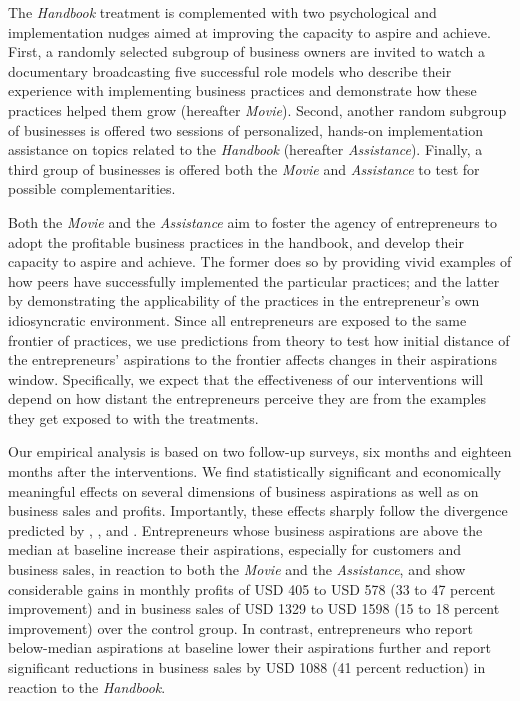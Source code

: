 \documentclass[11.5pt]{article}
\begin{document}

The \emph{Handbook} treatment is complemented with two psychological and implementation nudges aimed at improving the capacity to aspire and achieve. First, a randomly selected subgroup of business owners are invited to watch a documentary broadcasting five successful role models who describe their experience with implementing business practices and demonstrate how these practices helped them grow (hereafter \emph{Movie}).
Second, another random subgroup of businesses is offered two sessions of personalized, hands-on implementation assistance on topics related to the \emph{Handbook} (hereafter \emph{Assistance}). Finally, a third group of businesses is offered both the \emph{Movie} and \emph{Assistance} to test for possible complementarities.

Both the \emph{Movie} and the \emph{Assistance} aim to foster the agency of entrepreneurs to adopt the profitable business practices in the handbook, and develop their capacity to aspire and achieve. The former does so by providing vivid examples of how peers have successfully implemented the particular practices; and the latter by demonstrating the applicability of the practices in the entrepreneur's own idiosyncratic environment. Since all entrepreneurs are exposed to the same frontier of practices, we use predictions from theory to test how initial distance of the entrepreneurs' aspirations to the frontier affects changes in their aspirations window. Specifically, we expect that the effectiveness of our interventions will depend on how distant the entrepreneurs perceive they are from the examples they get exposed to with the treatments.

Our empirical analysis is based on two follow-up surveys, six months and eighteen months after the interventions. We find statistically significant and economically meaningful effects on several dimensions of business aspirations as well as on business sales and profits. Importantly, these effects sharply follow the divergence predicted by \citet{Ray2006}, \citet{Genicot2017}, and \citet{Dalton2016}. Entrepreneurs whose business aspirations are above the median at baseline increase their aspirations, especially for customers and business sales, in reaction to both the \emph{Movie} and the \emph{Assistance}, and show considerable gains in monthly profits of USD 405 to USD 578 (33 to 47 percent improvement) and in business sales of USD 1329 to USD 1598 (15 to 18 percent improvement) over the control group. In contrast, entrepreneurs who report below-median aspirations at baseline lower their aspirations further and report significant reductions in business sales by USD 1088 (41 percent reduction) in reaction to the \emph{Handbook}.
\end{document}
